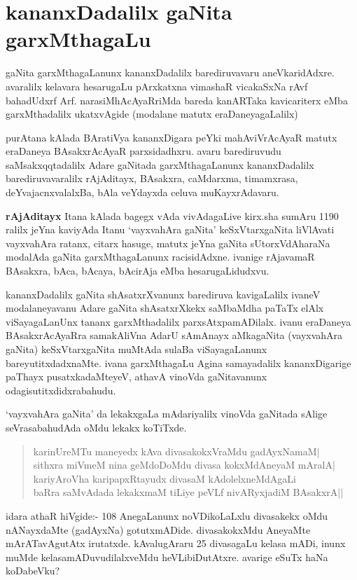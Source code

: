 \chapter{kananxDadalilx gaNita garxMthagaLu}

\vskip -20pt
gaNita garxMthagaLanunx kananxDadalilx barediruvavaru aneVkaridAdxre. avaralilx kelavara hesaru\-gaLu pArxkatxna vimashaR vicakaSxNa rAvf bahadUdxrf Arf. narasiMhAcAyaRriMda bareda kanARTaka kavicariterx eMba garxMthadalilx ukatxvAgide (modalane matutx eraDaneyagaLalilx)

purAtana kAlada BAratiVya kananxDigara peYki mahAviVrAcAyaR matutx eraDaneya BAsakxrAcAyaR parxsidadhxru. avaru barediruvudu saMsakxqqtadalilx Adare gaNitada garxMthagaLanunx kananxDadalilx barediruvavaralilx rAjAditayx, BAsakxra, caMdarxma, timamxrasa, deYvajacnxvalalxBa, bAla veYdayxda celuva muKayxrAdavaru.

\textbf{rAjAditayx} Itana kAlada bagegx vAda vivAdagaLive kirx.sha sumAru {\rm 1190} ralilx jeYna kaviyAda Itanu `vayxvahAra gaNita' keSxVtarxgaNita liVlAvati vayxvahAra ratanx, citarx hasuge, matutx jeYna gaNita sUtorxVdAharaNa modalAda gaNita garxMthagaLanunx racisidAdxne. ivanige rAjavamaR BAsakxra, bAca, bAcaya, bAcirAja eMba hesarugaLidudxvu.

kananxDadalilx gaNita shAsatxrXvanunx barediruva kavigaLalilx ivaneV modalaneyavanu Adare gaNita shAsatxrXkekx saMbaMdha paTaTx elAlx viSayagaLanUnx tananx garxMthadalilx parxsAtxpamADilalx. ivanu eraDaneya BAsakxrAcAyaRra samakAliVna AdarU sAmAnayx aMkagaNita (vayxvahAra gaNita) keSxVtarxgaNita muMtAda sulaBa viSayagaLanunx bareyutitxdadxnaMte. ivana garxMthagaLu Agina samayadalilx kananxDigarige paThayx pusatxkadaMteyeV, athavA vinoVda gaNitavanunx odagisutitxdidxrabahudu.

`vayxvahAra gaNita' da lekakxgaLa mAdariyalilx vinoVda gaNitada sAlige seVrasa\-bahudAda oMdu lekakx koTiTxde.
\begin{verse}
karinUreMTu maneyedx kAva divasakokxVraMdu gadAyxNamaM|\\
sithxra miVmeM nina geMdoDoMdu divasa kokxMdAneyaM mAralA|\\
kariyAroVha karipapxRtayudx divasaM kAdolelxneMdAgaLi\\
baRra saMvAdada lekakxmaM tiLiye peVLf nivARyxjadiM BAsakxrA||
\end{verse}

idara athaR hiVgide:- {\rm 108} AnegaLanunx noVDikoLaLxlu divasakekx oMdu nANayxdaMte (gadAyxNa) gotutxmADide. divasakokxMdu AneyaMte mArATa\-vAgutAtx irutatxde. kAvalugAraru {\rm 25} divasagaLu kelasa mADi, inunx muMde kelasa\break mADuvudilalxveMdu heVLibiDutAtxre. avarige eSuTx haNa koDabeVku?

